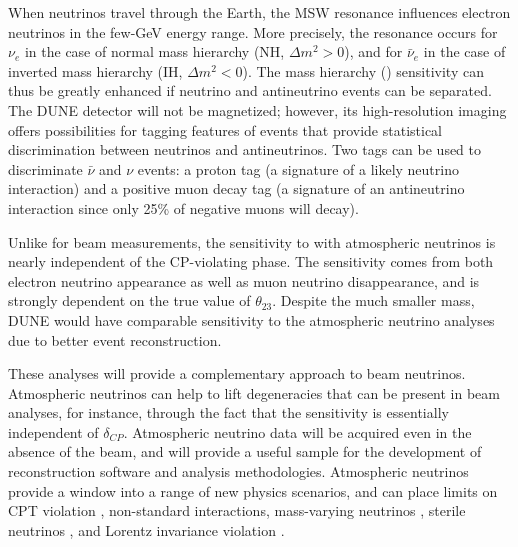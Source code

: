 When neutrinos travel through the Earth, the MSW resonance influences electron neutrinos in the few-GeV energy range. More precisely, the resonance occurs for $\nu_e$ in the case of normal mass hierarchy (NH, $\Delta m^2 > 0$), and for $\bar \nu_e$ in the case of inverted mass hierarchy (IH, $\Delta m^2 < 0$). 
The mass hierarchy () sensitivity can thus be greatly enhanced if neutrino and antineutrino events can be separated. The DUNE detector will not be magnetized; however, its high-resolution imaging offers possibilities for tagging features of events that provide statistical discrimination between neutrinos
and antineutrinos. Two tags can be used to discriminate $\bar \nu$  and $\nu$ events: a proton tag (a signature of a likely neutrino interaction) and a positive muon decay tag (a signature of an antineutrino interaction since only 25\% of negative muons will decay).

Unlike for beam measurements, the sensitivity to  with atmospheric neutrinos is nearly independent of the CP-violating phase. The sensitivity comes
from both electron neutrino appearance as well as muon neutrino disappearance, and is strongly dependent on the true value of $\theta_{23}$. Despite the much smaller mass, DUNE would have comparable sensitivity to the \hyperk atmospheric neutrino analyses due to better event reconstruction.

These analyses will provide a complementary approach to beam neutrinos. Atmospheric neutrinos can help to lift degeneracies that can be present in beam analyses, for instance, through the fact that the  sensitivity is essentially independent of $\delta_{CP}$. Atmospheric neutrino data will be acquired even in the absence of the beam, and will provide a useful sample for the development of reconstruction software and analysis methodologies. Atmospheric neutrinos provide a window into a range of new physics scenarios, and can place limits on CPT violation \cite{Kostelecky:2003cr}, non-standard interactions, mass-varying neutrinos \cite{Abe:2008zza}, sterile neutrinos \cite{Abe:2014gda}, and Lorentz invariance violation \cite{Kostelecky:2011gq}.

